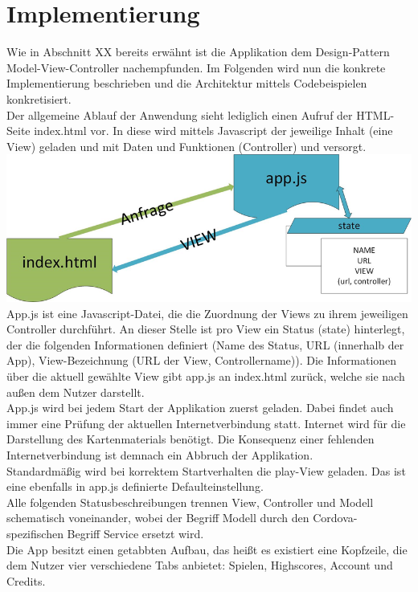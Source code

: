 \newpage
\section{Implementierung}

Wie in Abschnitt XX bereits erwähnt ist die Applikation dem Design-Pattern Model-View-Controller nachempfunden. Im Folgenden wird nun die konkrete Implementierung beschrieben und die Architektur mittels Codebeispielen konkretisiert.
\\
Der allgemeine Ablauf der Anwendung sieht lediglich einen Aufruf der HTML-Seite index.html vor. In diese wird mittels Javascript der jeweilige Inhalt (eine View) geladen und mit Daten und Funktionen (Controller) und versorgt.
\\
\includegraphics[width=1\textwidth]{ref/images/index.png} \\ 
App.js ist eine Javascript-Datei, die die Zuordnung der Views zu ihrem jeweiligen Controller durchführt. An dieser Stelle ist pro View ein Status (state) hinterlegt, der die folgenden Informationen definiert (Name des Status, URL (innerhalb der App), View-Bezeichnung (URL der View, Controllername)). Die Informationen über die aktuell gewählte View gibt app.js an index.html zurück, welche sie nach außen dem Nutzer darstellt.
\\
App.js wird bei jedem Start der Applikation zuerst geladen. Dabei findet auch immer eine Prüfung der aktuellen Internetverbindung statt. Internet wird für die Darstellung des Kartenmaterials benötigt. Die Konsequenz einer fehlenden Internetverbindung ist demnach ein Abbruch der Applikation.
\\
Standardmäßig wird bei korrektem Startverhalten die play-View geladen. Das ist eine ebenfalls in app.js definierte Defaulteinstellung.
\\
Alle folgenden Statusbeschreibungen trennen View, Controller und Modell schematisch voneinander, wobei der Begriff Modell durch den Cordova-spezifischen Begriff Service ersetzt wird.
\\
Die App besitzt einen getabbten Aufbau, das heißt es existiert eine Kopfzeile, die dem Nutzer vier verschiedene Tabs anbietet: Spielen, Highscores, Account und Credits. 
